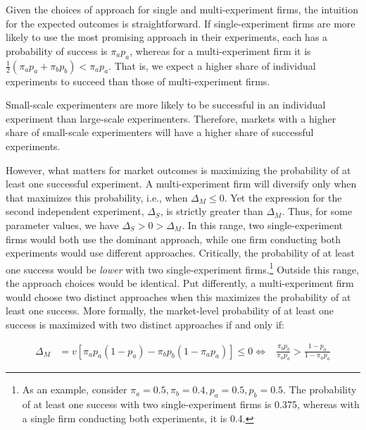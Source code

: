 \noindent Given the choices of approach for single and multi-experiment firms, the intuition for the expected outcomes is straightforward. If single-experiment firms are more likely to use the most promising approach in their experiments, each has a probability of success is $\pi_a p_a$, whereas for a multi-experiment firm it is $\frac{1}{2}(\pi_a p_a + \pi_b p_b) < \pi_a p_a$. That is, we expect a higher share of individual experiments to succeed than those of multi-experiment firms.

\begin{hypothesis}\label{prop:model-outcomes}
    Small-scale experimenters are more likely to be successful in an individual experiment than large-scale experimenters. Therefore, markets with a higher share of small-scale experimenters will have a higher share of successful experiments.
\end{hypothesis}

\noindent However, what matters for market outcomes is maximizing the probability of at least one successful experiment. A multi-experiment firm will diversify only when that maximizes this probability, i.e., when $\Delta_M \leq 0$. Yet the expression for the second independent experiment, $\Delta_S$, is strictly greater than $\Delta_M$. Thus, for some parameter values, we have $\Delta_S > 0 > \Delta_M$. In this range, two single-experiment firms would both use the dominant approach, while one firm conducting both experiments would use different approaches. Critically, the probability of at least one success would be \textit{lower} with two single-experiment firms.\footnote{As an example, consider $\pi_a = 0.5, \pi_b =0.4, p_a=0.5, p_b=0.5$. The probability of at least one success with two single-experiment firms is 0.375, whereas with a single firm conducting both experiments, it is 0.4.} Outside this range, the approach choices would be identical. Put differently, a multi-experiment firm would choose two distinct approaches when this maximizes the probability of at least one success. More formally, the market-level probability of at least one success is maximized with two distinct approaches if and only if:

\begin{equation}\label{eq: delta m < 0}
    \begin{aligned}
    \Delta_M &= v\left[\pi_ap_a(1-p_a)-\pi_bp_b(1-\pi_ap_a) \right] \leq 0 
    \iff &\frac{\pi_bp_b}{\pi_ap_a} > \frac{1-p_a}{1-\pi_ap_a}
    \end{aligned}
\end{equation}




